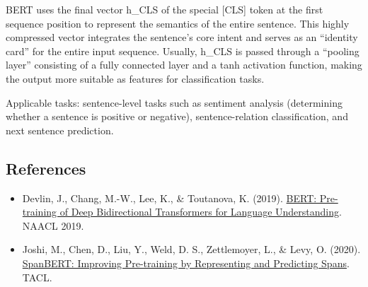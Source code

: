 BERT uses the final vector h\_CLS of the special {[}CLS{]} token at the first sequence position to represent the semantics of the entire sentence. This highly compressed vector integrates the sentence's core intent and serves as an ``identity card'' for the entire input sequence. Usually, h\_CLS is passed through a ``pooling layer'' consisting of a fully connected layer and a tanh activation function, making the output more suitable as features for classification tasks.

Applicable tasks: sentence-level tasks such as sentiment analysis (determining whether a sentence is positive or negative), sentence-relation classification, and next sentence prediction.

\FloatBarrier
{}
\hypertarget{references-71}{%
\subsection{References}\label{references-71}}

\vspace{0.25em}
\begin{itemize}
\tightlist
\item
  Devlin, J., Chang, M.-W., Lee, K., \& Toutanova, K. (2019). \href{https://arxiv.org/abs/1810.04805}{BERT: Pre-training of Deep Bidirectional Transformers for Language Understanding}. NAACL 2019.
\item
  Joshi, M., Chen, D., Liu, Y., Weld, D. S., Zettlemoyer, L., \& Levy, O. (2020). \href{https://arxiv.org/abs/1907.10529}{SpanBERT: Improving Pre-training by Representing and Predicting Spans}. TACL.
\end{itemize}

\clearpage
